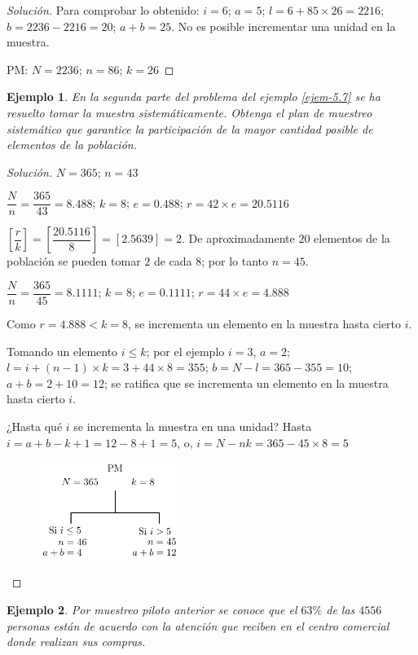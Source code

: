 \documentclass[a5paper,doc,10pt,noapacite]{apa6}
\newtheorem{ejem}{Ejemplo}
\begin{document}
{{\begin{proof}[Solución]
		Para comprobar lo obtenido: \(i=6\); \(a=5\); \(l=6+85 \times 26=2216\); \(b=2236-2216=20\); \(a+b=25\). No es posible incrementar una unidad en la muestra.
		
		PM: \(N=2236\); \(n=86\); \(k=26\)
\end{proof}

\begin{ejem}
	En la segunda parte del problema del ejemplo \eqref{ejem-5.7} se ha resuelto tomar la muestra sistemáticamente. Obtenga el plan de muestreo sistemático que garantice la participación de la mayor cantidad posible de elementos de la población.
\end{ejem}
\begin{proof}[Solución]\qquad
	
		\(N=365\); \(n=43\)
		
		\(\dfrac{N}{n}=\dfrac{365}{43}=8.488\); \(k=8\); \(e=0.488\); \(r=42 \times e=20.5116\)
		
		\(\left[\dfrac{r}{k}\right]=\left[\dfrac{20.5116}{8}\right]=[2.5639]=2\). De aproximadamente \(20\) elementos de la población se pueden tomar \(2\) de cada \(8\); por lo tanto \(n=45\).
		
		\(\dfrac{N}{n}=\dfrac{365}{45}=8.1111\); \(k=8\); \(e=0.1111\); \(r=44 \times e=4.888\)
		
		Como \(r=4.888<k=8\), se incrementa un elemento en la muestra hasta cierto \(i\).
		
		Tomando un elemento \(i\leq k\); por el ejemplo \(i=3\), \(a=2\);
		\(l=i+(n-1) \times k=3+44 \times 8=355\); \(b=N-l=365-355=10\); \(a+b=2+10=12\); se ratifica que se incrementa un elemento en la muestra hasta cierto \(i\).
		
		¿Hasta qué \(i\) se incrementa la muestra en una unidad?
		Hasta \(i=a+b-k+1=12-8+1=5\), o, \(i=N-nk=365-45 \times 8=5\)	\qedhere
		\begin{figure}[H]
			\centering
			\includegraphics[width=4.5cm]{Graficos/e-figura2}
		\end{figure}
		
\end{proof}


\begin{ejem}
	Por muestreo piloto anterior se conoce que el \(63\%\) de las \(4556\) personas están de acuerdo con la atención que reciben en el centro comercial donde realizan sus compras.
	

\end{ejem}}}
\end{document}
